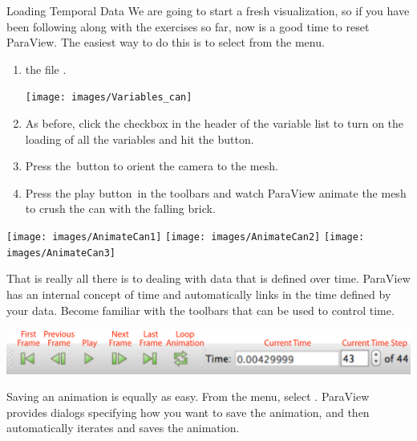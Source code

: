 \begin{exercise}{Loading Temporal Data}
  \label{ex:LoadingTemporalData}%
  We are going to start a fresh visualization, so if you have been
  following along with the exercises so far, now is a good time to reset
  ParaView.  The easiest way to do this is to select  \ra
   from the menu.

  \begin{enumerate}
  \item {}  the file .
    \begin{inlinefig}
      \texttt{[image: images/Variables\_can]}
    \end{inlinefig}
  \item As before, click the checkbox in the header of the variable list to
    turn on the loading of all the variables and hit the \apply button.
  \item Press the~\yPlus button to orient the camera to the mesh.
  \item Press the play button~\vcrPlay in the toolbars and watch ParaView
    animate the mesh to crush the can with the falling brick.
  \end{enumerate}

  \begin{inlinefig}
    \texttt{[image: images/AnimateCan1]}
    \texttt{[image: images/AnimateCan2]}
    \texttt{[image: images/AnimateCan3]}
  \end{inlinefig}
\end{exercise}

That is really all there is to dealing with data that is defined over time.
ParaView has an internal concept of time and automatically links in the
time defined by your data.  Become familiar with the toolbars that can be
used to control time.

\begin{inlinefig}
  \includegraphics[width=\linewidth]{images/AnimationToolbar}
\end{inlinefig}

Saving an animation is equally as easy.  From the menu, select 
\ra {}.  ParaView provides dialogs specifying how you
want to save the animation, and then automatically iterates and saves the
animation.

